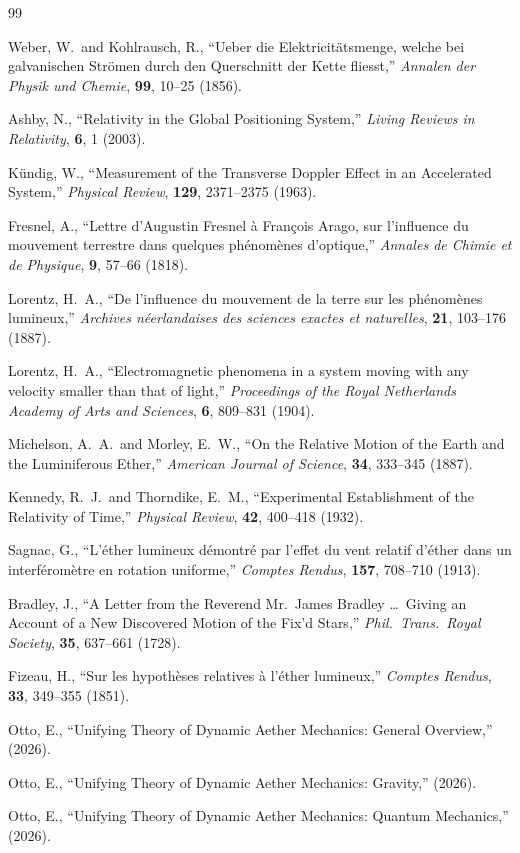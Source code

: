 ﻿\documentclass[12pt,letterpaper]{article}
\begin{document}
\begin{thebibliography}{99}

Weber, W.\ and Kohlrausch, R.,
``Ueber die Elektricit\"{a}tsmenge, welche bei galvanischen Str\"{o}men durch den Querschnitt der Kette fliesst,''
\textit{Annalen der Physik und Chemie}, \textbf{99}, 10--25 (1856).


Ashby, N.,
``Relativity in the Global Positioning System,''
\textit{Living Reviews in Relativity}, \textbf{6}, 1 (2003).


K\"{u}ndig, W.,
``Measurement of the Transverse Doppler Effect in an Accelerated System,''
\textit{Physical Review}, \textbf{129}, 2371--2375 (1963).


Fresnel, A.,
``Lettre d'Augustin Fresnel \`{a} Fran\c{c}ois Arago, sur l'influence du mouvement terrestre dans quelques ph\'{e}nom\`{e}nes d'optique,''
\textit{Annales de Chimie et de Physique}, \textbf{9}, 57--66 (1818).


Lorentz, H.~A.,
``De l'influence du mouvement de la terre sur les ph\'{e}nom\`{e}nes lumineux,''
\textit{Archives n\'{e}erlandaises des sciences exactes et naturelles}, \textbf{21}, 103--176 (1887).


Lorentz, H.~A.,
``Electromagnetic phenomena in a system moving with any velocity smaller than that of light,''
\textit{Proceedings of the Royal Netherlands Academy of Arts and Sciences}, \textbf{6}, 809--831 (1904).


Michelson, A.~A.\ and Morley, E.~W.,
``On the Relative Motion of the Earth and the Luminiferous Ether,''
\textit{American Journal of Science}, \textbf{34}, 333--345 (1887).


Kennedy, R.~J.\ and Thorndike, E.~M.,
``Experimental Establishment of the Relativity of Time,''
\textit{Physical Review}, \textbf{42}, 400--418 (1932).


Sagnac, G.,
``L'\'{e}ther lumineux d\'{e}montr\'{e} par l'effet du vent relatif d'\'{e}ther dans un interf\'{e}rom\`{e}tre en rotation uniforme,''
\textit{Comptes Rendus}, \textbf{157}, 708--710 (1913).


Bradley, J.,
``A Letter from the Reverend Mr.\ James Bradley \ldots\ Giving an Account of a New Discovered Motion of the Fix'd Stars,''
\textit{Phil.\ Trans.\ Royal Society}, \textbf{35}, 637--661 (1728).


Fizeau, H.,
``Sur les hypoth\`{e}ses relatives \`{a} l'\'{e}ther lumineux,''
\textit{Comptes Rendus}, \textbf{33}, 349--355 (1851).



Otto, E.,
``Unifying Theory of Dynamic Aether Mechanics: General Overview,''
(2026).

Otto, E.,
``Unifying Theory of Dynamic Aether Mechanics: Gravity,''
(2026).


Otto, E.,
``Unifying Theory of Dynamic Aether Mechanics: Quantum Mechanics,''
(2026).
\end{thebibliography}
\end{document}
